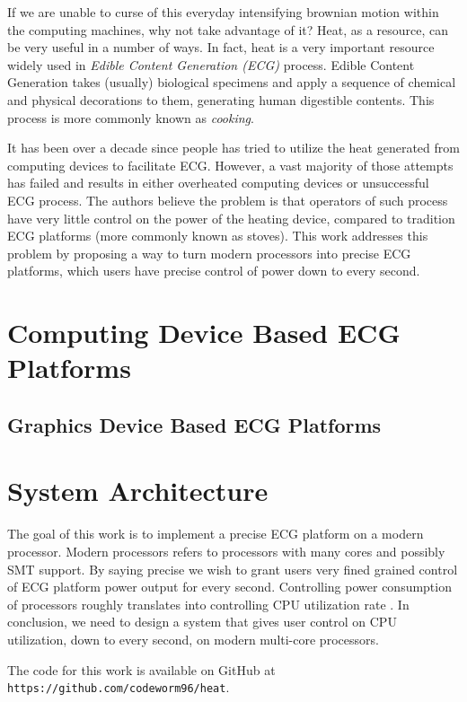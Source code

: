 \documentclass[conference]{IEEEtran}
\begin{document}
If we are unable to curse of this everyday intensifying brownian motion within the computing
machines, why not take advantage of it? Heat, as a resource, can be very useful in a number of ways.
In fact, heat is a very important resource widely used in \textit{Edible Content Generation (ECG)} process. 
Edible Content Generation takes (usually) biological specimens and apply a sequence of chemical and physical
decorations to them, generating human digestible contents. This process is more commonly known as \textit{cooking}.

It has been over a decade since people has tried to utilize the heat generated from computing
devices to facilitate ECG. However, a vast majority of those attempts has failed and results in
either overheated computing devices or unsuccessful ECG process. The authors believe the problem is
that operators of such process have very little control on the power of the heating device, compared to
tradition ECG platforms (more commonly known as stoves). This work addresses this problem by proposing
a way to turn modern processors into precise ECG platforms, which users have precise control of power down
to every second.

\section{Computing Device Based ECG Platforms}

\subsection{Graphics Device Based ECG Platforms}

\section{System Architecture}
The goal of this work is to implement a precise ECG platform on a modern processor. 
Modern processors refers to processors with many cores and possibly SMT support. By
saying precise we wish to grant users very fined grained control of ECG platform power
output for every second. Controlling power consumption of processors roughly translates
into controlling CPU utilization rate \cite{fan2007power}. In conclusion, we need to
design a system that gives user control on CPU utilization, down to every second, on 
modern multi-core processors. 

The code for this work is available on GitHub at \texttt{https://github.com/codeworm96/heat}.
\end{document}
